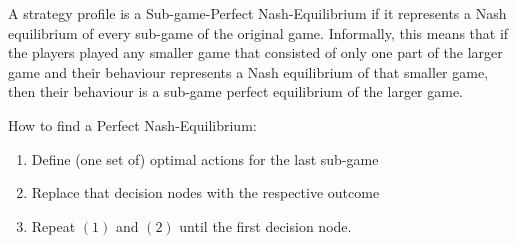 \begin{definition}  
A strategy profile is a Sub-game-Perfect Nash-Equilibrium if it represents a Nash equilibrium of every sub-game of the original game. Informally, this means that if the players played any smaller game that consisted of only one part of the larger game and their behaviour represents a Nash equilibrium of that smaller game, then their behaviour is a sub-game perfect equilibrium of the larger game. 

	How to find a Perfect Nash-Equilibrium:
	\begin{enumerate}
		\item Define (one set of) optimal actions for the last sub-game
		\item Replace that decision nodes with the respective outcome
		\item Repeat $(1)$ and $(2)$ until the first decision node.
	\end{enumerate}
\end{definition}


